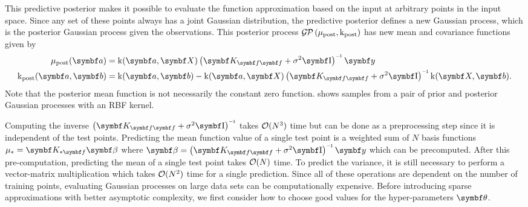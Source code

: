 This predictive posterior makes it possible to evaluate the function approximation based on the input at arbitrary points in the input space.
Since any set of these points always has a joint Gaussian distribution, the predictive posterior defines a new Gaussian process, which is the posterior Gaussian process given the observations.
This posterior process $\operatorname{\mathcal{G\mkern-1mu P}\mkern3mu}(\mu_\text{post}, \operatorname{k}_\text{post})$ has new mean and covariance functions given by
\begin{align}
    \begin{split}
        \mu_\text{post}(\mat{a}) &= \K(\mat{a}, \mat{X}) \left(\mat{K}_{\mat{f}\mat{f}} + \sigma^2 \Eye \right)\inv \mat{y} \\
        \K_\text{post}(\mat{a}, \mat{b}) &= \K(\mat{a}, \mat{b}) - \K(\mat{a}, \mat{X}) \left( \mat{K}_{\mat{f}\mat{f}} + \sigma^2 \Eye \right)\inv \K(\mat{X}, \mat{b}).
    \end{split}
\end{align}
Note that the posterior mean function is not necessarily the constant zero function.
 shows samples from a pair of prior and posterior Gaussian processes with an RBF kernel.

Computing the inverse $\left(\mat{K}_{\mat{f}\mat{f}} + \sigma^2 \Eye \right)\inv$ takes $\operatorname{\mathcal{O}}(N^3)$ time but can be done as a preprocessing step since it is independent of the test points.
Predicting the mean function value of a single test point is a weighted sum of $N$ basis functions $\mu_\ast = \mat{K_{\ast \mat{f}}} \mat{\beta}$ where $\mat{\beta} = \left(\mat{K}_{\mat{f}\mat{f}} + \sigma^2 \Eye \right)\inv \mat{y}$ which can be precomputed.
After this pre-computation, predicting the mean of a single test point takes $\operatorname{\mathcal{O}}(N)$ time.
To predict the variance, it is still necessary to perform a vector-matrix multiplication which takes $\operatorname{\mathcal{O}}(N^2)$ time for a single prediction.
Since all of these operations are dependent on the number of training points, evaluating Gaussian processes on large data sets can be computationally expensive.
Before introducing sparse approximations with better asymptotic complexity, we first consider how to choose good values for the hyper-parameters $\mat{\theta}$.

